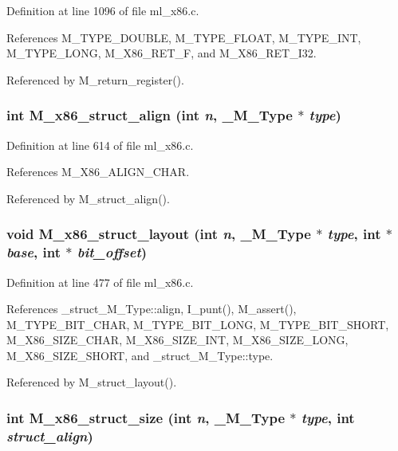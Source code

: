 Definition at line 1096 of file ml\_\-x86.c.

References M\_\-TYPE\_\-DOUBLE, M\_\-TYPE\_\-FLOAT, M\_\-TYPE\_\-INT, M\_\-TYPE\_\-LONG, M\_\-X86\_\-RET\_\-F, and M\_\-X86\_\-RET\_\-I32.

Referenced by M\_\-return\_\-register().
\subsubsection{\setlength{\rightskip}{0pt plus 5cm}int M\_\-x86\_\-struct\_\-align (int {\em n}, \bf{\_\-M\_\-Type} $\ast$ {\em type})}\label{ml__x86_8c_7deb558bda1f1ad54bd0b5f7f989f50d}




Definition at line 614 of file ml\_\-x86.c.

References M\_\-X86\_\-ALIGN\_\-CHAR.

Referenced by M\_\-struct\_\-align().
\subsubsection{\setlength{\rightskip}{0pt plus 5cm}void M\_\-x86\_\-struct\_\-layout (int {\em n}, \bf{\_\-M\_\-Type} $\ast$ {\em type}, int $\ast$ {\em base}, int $\ast$ {\em bit\_\-offset})}\label{ml__x86_8c_d2ed2e7ed8f48f7e74e131c8fb1162f1}




Definition at line 477 of file ml\_\-x86.c.

References \_\-struct\_\-M\_\-Type::align, I\_\-punt(), M\_\-assert(), M\_\-TYPE\_\-BIT\_\-CHAR, M\_\-TYPE\_\-BIT\_\-LONG, M\_\-TYPE\_\-BIT\_\-SHORT, M\_\-X86\_\-SIZE\_\-CHAR, M\_\-X86\_\-SIZE\_\-INT, M\_\-X86\_\-SIZE\_\-LONG, M\_\-X86\_\-SIZE\_\-SHORT, and \_\-struct\_\-M\_\-Type::type.

Referenced by M\_\-struct\_\-layout().
\subsubsection{\setlength{\rightskip}{0pt plus 5cm}int M\_\-x86\_\-struct\_\-size (int {\em n}, \bf{\_\-M\_\-Type} $\ast$ {\em type}, int {\em struct\_\-align})}\label{ml__x86_8c_63084addfc53362b05cd57c6014f9ee7}




